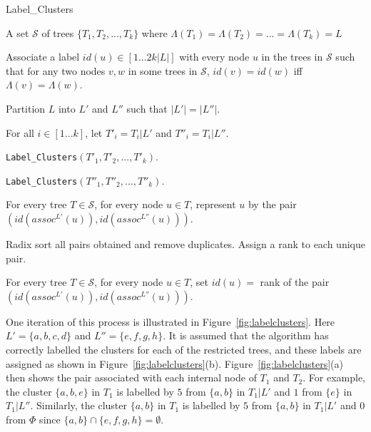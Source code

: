 \documentclass{article}
\newcommand{\leafset}{\Lambda}
\begin{document}
    \begin{algorithm}
        \caption{Label\_Clusters}
        \label{alg:labelclusters}

        \begin{algorithmic}[1]
            \Input A set $\mathcal{S}$ of trees $\{T_1, T_2, ..., T_k\}$ where $\leafset(T_1) = \leafset(T_2) = ... = \leafset(T_k) = L$

            \Output Associate a label $id(u) \in [1 ... 2k |L|]$ with every node $u$ in the trees in $\mathcal{S}$ such that for any two nodes $v, w$ in some trees in $\mathcal{S}$, $id(v) = id(w)$ iff $\leafset(v) = \leafset(w)$.

            \State Partition $L$ into $L'$ and $L''$ such that $|L'| = |L''|$.

            \State For all $i \in [1 ... k]$, let $T'_i = T_i|L'$ and $T''_i = T_i|L''$.

            \State \texttt{Label\_Clusters}$(T'_1, T'_2, ..., T'_k)$.

            \State \texttt{Label\_Clusters}$(T''_1, T''_2, ..., T''_k)$.

            \State For every tree $T \in \mathcal{S}$, for every node $u \in T$, represent $u$ by the pair $(id(assoc^{L'}(u)), id(assoc^{L''}(u)))$.

            \State Radix sort all pairs obtained and remove duplicates. Assign a rank to each unique pair.

            \State For every tree $T \in \mathcal{S}$, for every node $u \in T$, set $id(u) = $ rank of the pair $(id(assoc^{L'}(u)), id(assoc^{L''}(u)))$.
        \end{algorithmic}
    \end{algorithm}

    One iteration of this process is illustrated in Figure~\ref{fig:labelclusters}. Here $L' = \{a, b, c, d\}$ and $L'' = \{e, f, g, h\}$. It is assumed that the algorithm has correctly labelled the clusters for each of the restricted trees, and these labels are assigned as shown in Figure~\ref{fig:labelclusters}(b). Figure~\ref{fig:labelclusters}(a) then shows the pair associated with each internal node of $T_1$ and $T_2$. For example, the cluster $\{a, b, e\}$ in $T_1$ is labelled by $5$ from $\{a, b\}$ in $T_1|L'$ and $1$ from $\{e\}$ in $T_1|L''$. Similarly, the cluster $\{a, b\}$ in $T_1$ is labelled by $5$ from $\{a, b\}$ in $T_1|L'$ and $0$ from $\Phi$ since $\{a, b\} \cap \{e, f, g, h\} = \emptyset$.
\end{document}
